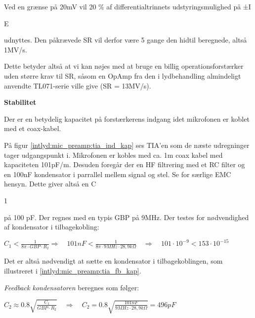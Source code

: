 Ved en grænse på 20mV vil 20 \% af differentialtrinnets udstyringsmulighed på ±I\begin{tiny}E\end{tiny} udnyttes. Den påkrævede SR vil derfor være 5 gange den hidtil beregnede, altså 1MV/s.

Dette betyder altså at vi kan nøjes med at bruge en billig operationsforstærker uden større krav til SR, såsom en OpAmp fra den i lydbehandling almindeligt anvendte TL071-serie ville give (SR = 13MV/s).

\textbf{Stabilitet}

Der er en betydelig kapacitet på forstærkerens indgang idet mikrofonen er koblet med et coax-kabel.


På figur \ref{intlyd:mic_preamp:tia_ind_kap} ses TIA'en som de næste udregninger tager udgangspunkt i. Mikrofonen er kobles med ca. 1m coax kabel med kapaciteten 101pF/m. Desuden foregår der en HF filtrering med et RC filter og en 100nF kondensator i parrallel mellem signal og stel. Se \citep[EMC]{cd} for særlige EMC hensyn. Dette giver altså en C\begin{tiny}1\end{tiny} på 100 pF.
Der regnes med en typis GBP på 9MHz. Der testes for nødvendighed af kondensator i tilbagekobling:
\begin{center}
${ C }_{ 1 }<\frac { 1 }{ 8\pi \cdot GBP\cdot { R }_{ 2 } } \Longrightarrow \quad 101nF<\frac { 1 }{ 8\pi \cdot 9MHz\cdot 28,9k\Omega  } \quad \Longrightarrow \quad 101\cdot { 10 }^{ -9 }<153\cdot { 10 }^{ -15 }$
\end{center}
Det er altså nødvendigt at sætte en kondensator i tilbagekoblingen, som illustreret i \ref{intlyd:mic_preamp:tia_fb_kap}.


\textit{Feedback kondensatoren} beregnes som følger:
\begin{center}
${ C }_{ 2 }\approx 0.8\sqrt { \frac { { C }_{ 1 } }{ GBP\cdot { R }_{ 2 } }  } \quad \Longrightarrow \quad { C }_{ 2 }=0.8\sqrt { \frac { 101nF }{ 9MHz\cdot 28,9k\Omega  }  } =496pF\quad$
\end{center}

